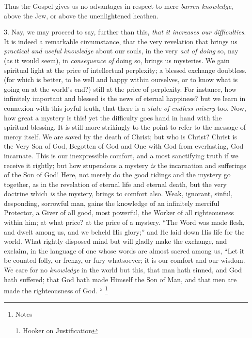 Thus the Gospel gives us no advantages in respect to
mere \emph{barren knowledge}, above the Jew, or above
the unenlightened heathen.

3. Nay, we may proceed to say, further than this, \emph{that
it increases our difficulties}. It is indeed a
remarkable circumstance, that the very revelation that
brings us \emph{practical and useful knowledge} about
our souls, in the very \emph{act of doing} so, nay (as
it would seem), in \emph{consequence of} doing so,
brings us mysteries. We gain spiritual light at the price
of intellectual perplexity; a blessed exchange doubtless,
(for which is better, to be well and happy within
ourselves, or to know what is going on at the world's
end?) still at the price of perplexity. For instance, how
infinitely important and blessed is the news of eternal
happiness? but we learn in connexion with this joyful
truth, that there is a \emph{state of endless misery}
too. Now, how great a mystery is this! yet the difficulty
goes hand in hand with the spiritual blessing. It is
still more strikingly to the point to refer to the
message of mercy itself. We are saved by the death of
Christ; but who is Christ? Christ is the Very Son of God,
Begotten of God and One with God from everlasting, God
incarnate. This is our inexpressible comfort, and a most
sanctifying truth if we receive it rightly; but how
stupendous a mystery \emph{is} the incarnation and
sufferings of the Son of God! Here, not merely do the
good tidings and the mystery go together, as in the
revelation of eternal life and eternal death, but the
very doctrine which \emph{is} the mystery, brings to
comfort also. Weak, ignorant, sinful, desponding,
sorrowful man, gains the knowledge of an infinitely
merciful Protector, a Giver of all good, most powerful,
the Worker of all righteousness within him; at what
price? at the price of a mystery. ``The Word was made
flesh, and dwelt among us, and we beheld His glory;''
and He laid down His life for the world. What rightly
disposed mind but will gladly make the exchange, and
exclaim, in the language of one whose words are almost
sacred among us, ``Let it be counted folly, or
frenzy, or fury whatsoever; it is our comfort and our
wisdom. We care for no \emph{knowledge} in the world
but this, that man hath sinned, and God hath suffered;
that God hath made Himself the Son of Man, and that men
are made the righteousness of God. `` \footnote{Notes

1. Hooker on Justification}

